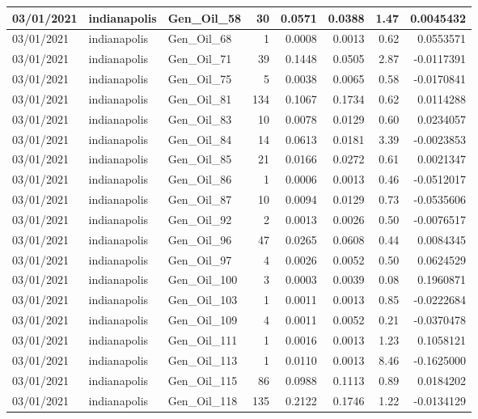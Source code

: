 \documentclass[
  letterpaper,
  DIV=11,
  numbers=noendperiod]{scrartcl}
\begin{document}
\begin{tabular}{l|l|l|r|r|r|r|r}
\hline
03/01/2021 & indianapolis & Gen\_Oil\_58 & 30 & 0.0571 & 0.0388 & 1.47 & 0.0045432\\
\hline
03/01/2021 & indianapolis & Gen\_Oil\_68 & 1 & 0.0008 & 0.0013 & 0.62 & 0.0553571\\
\hline
03/01/2021 & indianapolis & Gen\_Oil\_71 & 39 & 0.1448 & 0.0505 & 2.87 & -0.0117391\\
\hline
03/01/2021 & indianapolis & Gen\_Oil\_75 & 5 & 0.0038 & 0.0065 & 0.58 & -0.0170841\\
\hline
03/01/2021 & indianapolis & Gen\_Oil\_81 & 134 & 0.1067 & 0.1734 & 0.62 & 0.0114288\\
\hline
03/01/2021 & indianapolis & Gen\_Oil\_83 & 10 & 0.0078 & 0.0129 & 0.60 & 0.0234057\\
\hline
03/01/2021 & indianapolis & Gen\_Oil\_84 & 14 & 0.0613 & 0.0181 & 3.39 & -0.0023853\\
\hline
03/01/2021 & indianapolis & Gen\_Oil\_85 & 21 & 0.0166 & 0.0272 & 0.61 & 0.0021347\\
\hline
03/01/2021 & indianapolis & Gen\_Oil\_86 & 1 & 0.0006 & 0.0013 & 0.46 & -0.0512017\\
\hline
03/01/2021 & indianapolis & Gen\_Oil\_87 & 10 & 0.0094 & 0.0129 & 0.73 & -0.0535606\\
\hline
03/01/2021 & indianapolis & Gen\_Oil\_92 & 2 & 0.0013 & 0.0026 & 0.50 & -0.0076517\\
\hline
03/01/2021 & indianapolis & Gen\_Oil\_96 & 47 & 0.0265 & 0.0608 & 0.44 & 0.0084345\\
\hline
03/01/2021 & indianapolis & Gen\_Oil\_97 & 4 & 0.0026 & 0.0052 & 0.50 & 0.0624529\\
\hline
03/01/2021 & indianapolis & Gen\_Oil\_100 & 3 & 0.0003 & 0.0039 & 0.08 & 0.1960871\\
\hline
03/01/2021 & indianapolis & Gen\_Oil\_103 & 1 & 0.0011 & 0.0013 & 0.85 & -0.0222684\\
\hline
03/01/2021 & indianapolis & Gen\_Oil\_109 & 4 & 0.0011 & 0.0052 & 0.21 & -0.0370478\\
\hline
03/01/2021 & indianapolis & Gen\_Oil\_111 & 1 & 0.0016 & 0.0013 & 1.23 & 0.1058121\\
\hline
03/01/2021 & indianapolis & Gen\_Oil\_113 & 1 & 0.0110 & 0.0013 & 8.46 & -0.1625000\\
\hline
03/01/2021 & indianapolis & Gen\_Oil\_115 & 86 & 0.0988 & 0.1113 & 0.89 & 0.0184202\\
\hline
03/01/2021 & indianapolis & Gen\_Oil\_118 & 135 & 0.2122 & 0.1746 & 1.22 & -0.0134129\\

\end{tabular}
\end{document}
